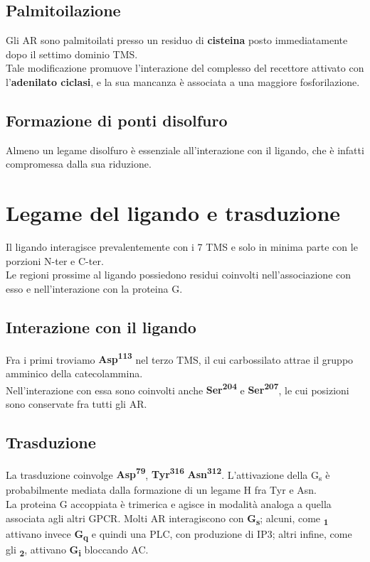 \documentclass[a4paper, 12pt]{article}
\begin{document}
\subsection{Palmitoilazione}
Gli AR sono palmitoilati presso un residuo di \textbf{cisteina} posto immediatamente dopo il settimo dominio TMS.\\
Tale modificazione promuove l'interazione del complesso del recettore attivato con l'\textbf{adenilato ciclasi}, e la sua mancanza è associata a una maggiore fosforilazione.

\subsection{Formazione di ponti disolfuro}
Almeno un legame disolfuro è essenziale all'interazione con il ligando, che è infatti compromessa dalla sua riduzione.

\section{Legame del ligando e trasduzione}
Il ligando interagisce prevalentemente con i 7 TMS e solo in minima parte con le porzioni N-ter e C-ter.\\
Le regioni prossime al ligando possiedono residui coinvolti nell'associazione con esso e nell'interazione con la proteina G.

\subsection{Interazione con il ligando}
Fra i primi troviamo \textbf{Asp\textsuperscript{113}} nel terzo TMS, il cui carbossilato attrae il gruppo amminico della catecolammina. \\
Nell'interazione con essa sono coinvolti anche \textbf{Ser\textsuperscript{204}} e \textbf{Ser\textsuperscript{207}}, le cui posizioni sono conservate fra tutti gli AR.

\subsection{Trasduzione}
La trasduzione coinvolge \textbf{Asp\textsuperscript{79}}, \textbf{Tyr\textsuperscript{316}} \textbf{Asn\textsuperscript{312}}. L'attivazione della G\textsubscript{s} è probabilmente mediata dalla formazione di un legame H fra Tyr e Asn.\\
La proteina G accoppiata è trimerica e agisce in modalità analoga a quella associata agli altri GPCR. Molti AR interagiscono con \textbf{G\textsubscript{s}}; alcuni, come \textbf{\textalpha\textsubscript{1}} attivano invece \textbf{G\textsubscript{q}} e quindi una PLC, con produzione di IP3; altri infine, come gli \textbf{\textalpha\textsubscript{2}}, attivano \textbf{G\textsubscript{i}} bloccando AC.
\end{document}
